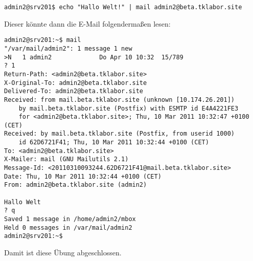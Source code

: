 \begin{lstlisting}
admin2@srv201$ echo "Hallo Welt!" | mail admin2@beta.tklabor.site
\end{lstlisting}

Dieser könnte dann die E-Mail folgendermaßen lesen:
\begin{lstlisting}
admin2@srv201:~$ mail
"/var/mail/admin2": 1 message 1 new
>N   1 admin2             Do Apr 10 10:32  15/789   
? 1
Return-Path: <admin2@beta.tklabor.site>
X-Original-To: admin2@beta.tklabor.site
Delivered-To: admin2@beta.tklabor.site
Received: from mail.beta.tklabor.site (unknown [10.174.26.201])
	by mail.beta.tklabor.site (Postfix) with ESMTP id E4A4221FE3
	for <admin2@beta.tklabor.site>; Thu, 10 Mar 2011 10:32:47 +0100 (CET)
Received: by mail.beta.tklabor.site (Postfix, from userid 1000)
	id 62D6721F41; Thu, 10 Mar 2011 10:32:44 +0100 (CET)
To: <admin2@beta.tklabor.site>
X-Mailer: mail (GNU Mailutils 2.1)
Message-Id: <20110310093244.62D6721F41@mail.beta.tklabor.site>
Date: Thu, 10 Mar 2011 10:32:44 +0100 (CET)
From: admin2@beta.tklabor.site (admin2)

Hallo Welt
? q
Saved 1 message in /home/admin2/mbox
Held 0 messages in /var/mail/admin2
admin2@srv201:~$ 
\end{lstlisting}

Damit ist diese Übung abgeschlossen.
